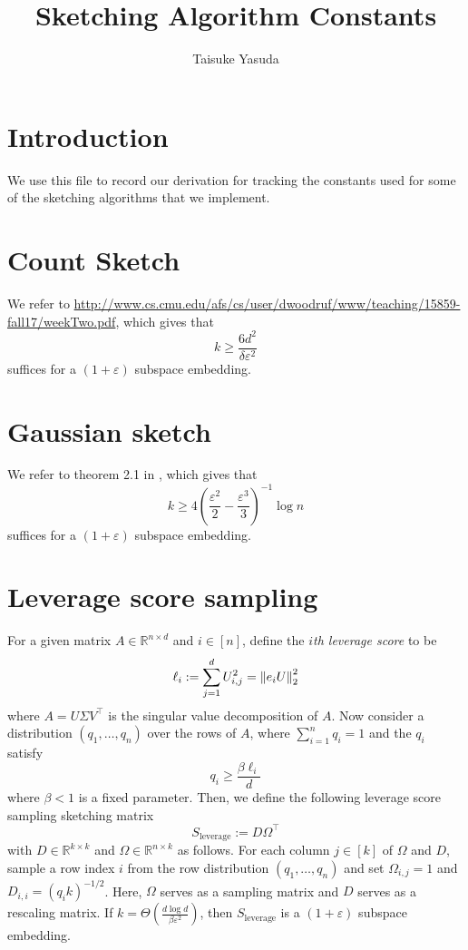 \documentclass{article}
\title{Sketching Algorithm Constants}
\author{Taisuke Yasuda}
\begin{document}
\maketitle

\section{Introduction}
We use this file to record our derivation for tracking the constants used for some of the sketching algorithms that we implement. 

\section{Count Sketch}
We refer to \url{http://www.cs.cmu.edu/afs/cs/user/dwoodruf/www/teaching/15859-fall17/weekTwo.pdf}, which gives that
\[
	k\geq \frac{6d^2}{\delta\varepsilon^2}
\]
suffices for a $(1+\varepsilon)$ subspace embedding. 

\section{Gaussian sketch}
We refer to theorem 2.1 in \cite{dasgupta2003elementary}, which gives that
\[
	k\geq 4\left(\frac{\varepsilon^2}2-\frac{\varepsilon^3}3\right)^{-1}\log n
\]
suffices for a $(1+\varepsilon)$ subspace embedding. 

\section{Leverage score sampling}
For a given matrix $A\in\mathbb R^{n\times d}$ and $i\in[n]$, define the \emph{$i$th leverage score} to be
\[
	\ell_i := \sum_{j=1}^d U_{i,j}^2 = \left\Vert e_iU\right\Vert_2^2
\]
where $A = U\Sigma V^\top$ is the singular value decomposition of $A$. Now consider a distribution $(q_1,\dots,q_n)$ over the rows of $A$, where $\sum_{i=1}^n q_i = 1$ and the $q_i$ satisfy
\[
	q_i\geq\frac{\beta\ell_i}{d}
\]
where $\beta<1$ is a fixed parameter. Then, we define the following leverage score sampling sketching matrix
\[
	S_{\text{leverage}} := D\Omega^\top
\]
with $D\in\mathbb R^{k\times k}$ and $\Omega\in\mathbb R^{n\times k}$ as follows. For each column $j\in[k]$ of $\Omega$ and $D$, sample a row index $i$ from the row distribution $(q_1,\dots,q_n)$ and set $\Omega_{i,j} = 1$ and $D_{i,i} = (q_i k)^{-1/2}$. Here, $\Omega$ serves as a sampling matrix and $D$ serves as a rescaling matrix. If $k = \Theta\left(\frac{d\log d}{\beta\varepsilon^2}\right)$, then $S_{\text{leverage}}$ is a $(1+\varepsilon)$ subspace embedding.
\end{document}
